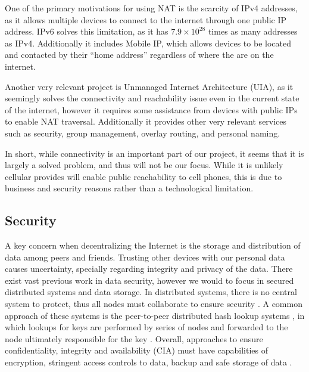 One of the primary motivations for using NAT is the scarcity of IPv4 addresses, as it allows multiple devices to connect to the internet through one public IP address.
IPv6 solves this limitation, as it has $7.9 \times 10^{28}$ times as many addresses as IPv4.
Additionally it includes Mobile IP, which allows devices to be located and contacted by their "`home address"' regardless of where the are on the internet.

Another very relevant project is Unmanaged Internet Architecture (UIA), as it seemingly solves the connectivity and reachability issue even in the current state of the internet, however it requires some assistance from devices with public IPs to enable NAT traversal.
Additionally it provides other very relevant services such as security, group management, overlay routing, and personal naming.

In short, while connectivity is an important part of our project, it seems that it is largely a solved problem, and thus will not be our focus.
While it is unlikely cellular provides will enable public reachability to cell phones, this is due to business and security reasons rather than a technological limitation.


\subsection{Security}
A key concern when decentralizing the Internet is the storage and distribution of data among peers and friends. 
Trusting other devices with our personal data causes uncertainty, specially regarding integrity and privacy of the data. 
There exist vast previous work in data security, however we would to focus in secured distributed systems and data storage.
In distributed systems, there is no central system to protect, thus all nodes must collaborate to ensure security \cite{sit2002security}. 
A common approach of these systems is the peer-to-peer distributed hash lookup systems \cite{ratnasamy2001scalable, rowstron2001pastry, stoica2001chord}, in which lookups for keys are performed by series of nodes and forwarded to the node ultimately responsible for the key \cite{sit2002security}. 
Overall, approaches to ensure confidentiality, integrity and availability (CIA) must have capabilities of encryption, stringent access controls to data, backup and safe storage of data \cite{kaufman2009data}.

